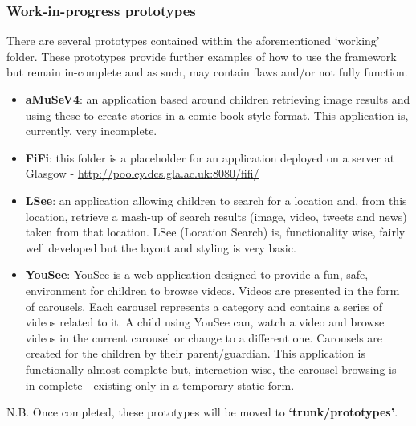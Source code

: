 \documentclass[letterpaper,10pt,english]{sphinxmanual}
\begin{document}
\subsubsection{Work-in-progress prototypes}
\label{repo:work-in-progress-prototypes}
There are several prototypes contained within the aforementioned `working' folder. These prototypes provide further examples of how to use the framework but remain in-complete and as such, may contain flaws and/or not fully function.
\begin{itemize}
\item {} 
\textbf{aMuSeV4}: an application based around children retrieving image results and using these to create stories in a comic book style format. This application is, currently, very incomplete.

\item {} 
\textbf{FiFi}: this folder is a placeholder for an application deployed on a server at Glasgow - \href{http://pooley.dcs.gla.ac.uk:8080/fifi/}{http://pooley.dcs.gla.ac.uk:8080/fifi/}

\item {} 
\textbf{LSee}: an application allowing children to search for a location and, from this location, retrieve a mash-up of search results (image, video, tweets and news) taken from that location. LSee (Location Search) is, functionality wise, fairly well developed but the layout and styling is very basic.

\item {} 
\textbf{YouSee}: YouSee is a web application designed to provide a fun, safe, environment for children to browse videos. Videos are presented in the form of carousels. Each carousel represents a category and contains a series of videos related to it. A child using YouSee can, watch a video and browse videos in the current carousel or change to a different one. Carousels are created for the children by their parent/guardian. This application is functionally almost complete but, interaction wise, the carousel browsing is in-complete - existing only in a temporary static form.

\end{itemize}

N.B. Once completed, these prototypes will be moved to \textbf{`trunk/prototypes'}.
\end{document}
